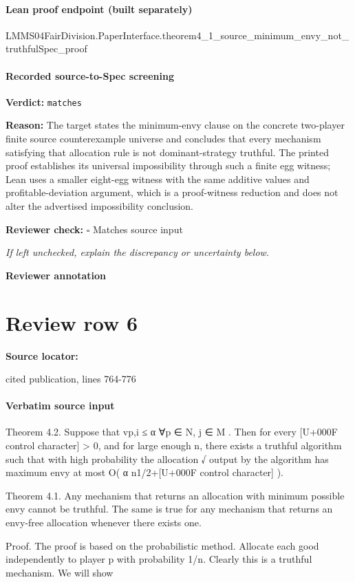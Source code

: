 \documentclass[10pt]{article}
\newcommand{\reviewerbox}{%
  \par\noindent\fbox{\parbox{0.96\linewidth}{\rule{0pt}{0.38in}}}\par
}
\newcommand{\reviewmatch}[1]{%
  \par\noindent\textbf{Reviewer check:} $\square$\; #1\par
  \noindent\emph{If left unchecked, explain the discrepancy or uncertainty below.}\par
}
\begin{document}
\paragraph{Lean proof endpoint (built separately)}\begin{ReviewVerbatim}
LMMS04FairDivision.PaperInterface.theorem4_1_source_minimum_envy_not_truthfulSpec_proof
\end{ReviewVerbatim}

\paragraph{Recorded source-to-Spec screening}
\textbf{Verdict:} \texttt{matches}
\\
{\raggedright
\textbf{Reason:} The target states the minimum-\allowbreak{}envy clause on the concrete two-\allowbreak{}player finite source counterexample universe and concludes that every mechanism satisfying that allocation rule is not dominant-\allowbreak{}strategy truthful.\allowbreak{} The printed proof establishes its universal impossibility through such a finite egg witness;\allowbreak{} Lean uses a smaller eight-\allowbreak{}egg witness with the same additive values and profitable-\allowbreak{}deviation argument, which is a proof-\allowbreak{}witness reduction and does not alter the advertised impossibility conclusion.\allowbreak{}
\par}
\reviewmatch{Matches source input}
\noindent\textbf{Reviewer annotation}\par
\reviewerbox
\clearpage
\hypertarget{source-claim-41e9057437421225}{}
\section*{Review row 6}
\textbf{Source locator:} {\footnotesize\raggedright cited publication, lines 764-\allowbreak{}776\par}
\paragraph{Verbatim source input}
\begin{ReviewVerbatim}
Theorem 4.2. Suppose that vp,i ≤ α ∀p ∈ N, j ∈ M .
Then for every [U+000F control character] > 0, and for large enough n, there exists
a truthful algorithm such that with high probability the allocation
√ output by the algorithm has maximum envy at most
O( α n1/2+[U+000F control character] ).

Theorem 4.1. Any mechanism that returns an allocation
with minimum possible envy cannot be truthful. The same is
true for any mechanism that returns an envy-free allocation
whenever there exists one.

Proof. The proof is based on the probabilistic method.
Allocate each good independently to player p with probability 1/n. Clearly this is a truthful mechanism. We will show
\end{ReviewVerbatim}
\end{document}
